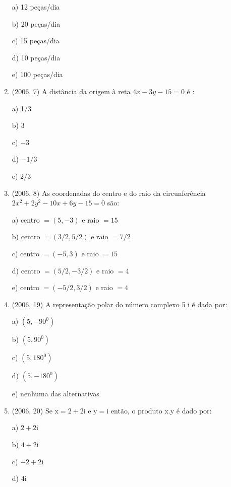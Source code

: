 \documentclass{article}
\begin{document}
\begin{enumerate}
a) 12 peças/dia

b) 20 peças/dia

c) 15 peças/dia

d) 10 peças/dia

e) 100 peças/dia \newline






\item(2006, 7) A distância da origem à reta $4 x-3 y-15=0$ é :

a) 1$/ 3$

b) 3

c) $-3$

d) $-1 / 3$

e) 2$/ 3$\newline



\item(2006, 8) As coordenadas do centro e do raio da circunferência $2 x^{2}+2 y^{2}-10 x+6 y-15=0$ são:

a) centro $=(5,-3)$ e raio $=15$

b) centro $=(3 / 2,5 / 2)$ e raio $=7 / 2$

c) centro $=(-5,3)$ e raio $=15$

d) centro $=(5 / 2,-3 / 2)$ e raio $=4$

e) centro $=(-5 / 2,3 / 2)$ e raio $=4$\newline





\item(2006, 19) A representação polar do número complexo 5 i é dada por:

a) $\left(5,-90^{0}\right)$

b) $\left(5,90^{0}\right)$

c) $\left(5,180^{0}\right)$

d) $\left(5,-180^{0}\right)$

e) nenhuma das alternativas \newline



\item(2006, 20) Se $\mathrm{x}=2+2 \mathrm{i}$ e $\mathrm{y}=\mathrm{i}$ então, o produto x.y é dado por:

a) $2+2 \mathrm{i}$

b) $4+2 \mathrm{i}$

c) $-2+2 \mathrm{i}$

d) 4$\mathrm{i}$


\end{enumerate}
\end{document}
